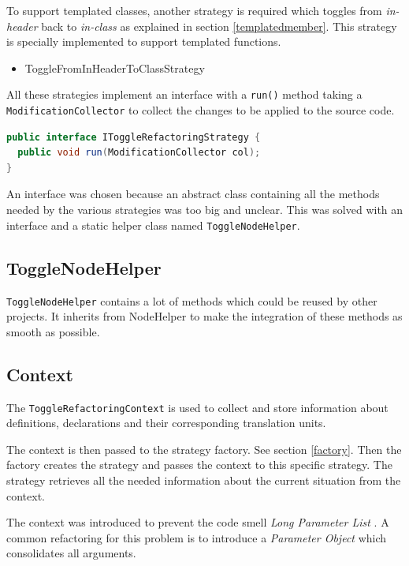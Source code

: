 To support templated classes, another strategy is required which toggles from
\textit{in-header} back to \textit{in-class} as explained in section
\ref{templatedmember}. This strategy is specially implemented to support
templated functions.

\begin{itemize}
\item ToggleFromInHeaderToClassStrategy
\end{itemize}

All these strategies implement an interface with a \texttt{run()} method taking
a \texttt{ModificationCollector} to collect the changes to be applied to the 
source code.

\begin{lstlisting}[caption={IToggleRefactoringStrategy},
label={01templatedMember}, language=Java]
public interface IToggleRefactoringStrategy {
  public void run(ModificationCollector col);
}
\end{lstlisting}

An interface was chosen because an abstract class containing all the methods
needed by the various strategies was too big and unclear. This was solved with an
interface and a static helper class named \texttt{ToggleNodeHelper}.

\subsection{ToggleNodeHelper}

\texttt{ToggleNodeHelper} contains a lot of methods which could be reused by
other projects. It inherits from NodeHelper to make the integration of these
methods as smooth as possible.

\subsection{Context}

The \texttt{ToggleRefactoringContext} is used to collect and store information 
about definitions, declarations and their corresponding translation units.

The context is then passed to the strategy factory. See section
\ref{factory}. Then the factory creates the strategy and passes the context to
this specific strategy. The strategy retrieves all the needed information about
the current situation from the context.

The context was introduced to prevent the code smell \textit{Long Parameter
List} \cite{Refactoring}. A common refactoring for this problem is to
introduce a \textit{Parameter Object} which consolidates all arguments.

